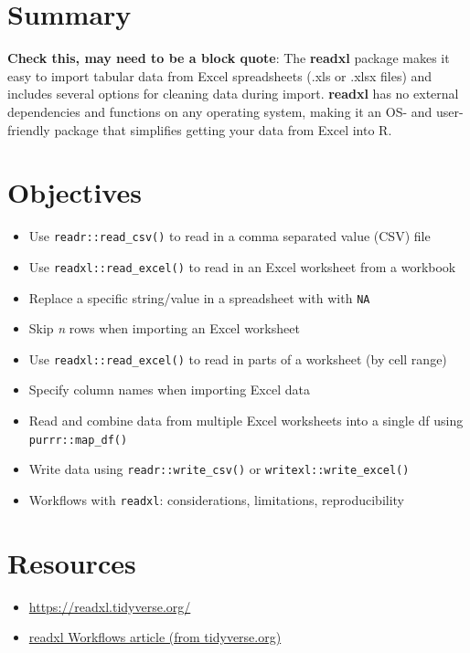 \documentclass[]{book}
\providecommand{\tightlist}{%
  \setlength{\itemsep}{0pt}\setlength{\parskip}{0pt}}
\begin{document}
\hypertarget{summary}{%
\section{Summary}\label{summary}}

\textbf{Check this, may need to be a block quote}: The \textbf{readxl} package makes it easy to import tabular data from Excel spreadsheets (.xls or .xlsx files) and includes several options for cleaning data during import. \textbf{readxl} has no external dependencies and functions on any operating system, making it an OS- and user-friendly package that simplifies getting your data from Excel into R.

\hypertarget{objectives-1}{%
\section{Objectives}\label{objectives-1}}

\begin{itemize}
\tightlist
\item
  Use \texttt{readr::read\_csv()} to read in a comma separated value (CSV) file
\item
  Use \texttt{readxl::read\_excel()} to read in an Excel worksheet from a workbook
\item
  Replace a specific string/value in a spreadsheet with with \texttt{NA}
\item
  Skip \emph{n} rows when importing an Excel worksheet
\item
  Use \texttt{readxl::read\_excel()} to read in parts of a worksheet (by cell range)
\item
  Specify column names when importing Excel data
\item
  Read and combine data from multiple Excel worksheets into a single df using \texttt{purrr::map\_df()}
\item
  Write data using \texttt{readr::write\_csv()} or \texttt{writexl::write\_excel()}
\item
  Workflows with \texttt{readxl}: considerations, limitations, reproducibility
\end{itemize}

\hypertarget{resources-3}{%
\section{Resources}\label{resources-3}}

\begin{itemize}
\tightlist
\item
  \url{https://readxl.tidyverse.org/}
\item
  \href{https://readxl.tidyverse.org/articles/articles/readxl-workflows.html}{readxl Workflows article (from tidyverse.org)}
\end{itemize}
\end{document}
